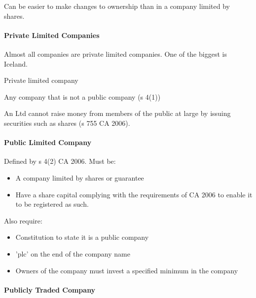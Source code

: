 \documentclass[
]{article}
\providecommand{\tightlist}{%
  \setlength{\itemsep}{0pt}\setlength{\parskip}{0pt}}
\newenvironment{env-c5a1f670-a83c-479e-bf69-eca11d8e9e55}
{
    \savenotes\tcolorbox[blanker,breakable,left=5pt,borderline west={2pt}{-4pt}{gold}]
}
{
    \endtcolorbox\spewnotes
}
\begin{document}
Can be easier to make changes to ownership than in a company limited by
shares.

\hypertarget{private-limited-companies}{%
\paragraph{Private Limited Companies}\label{private-limited-companies}}

Almost all companies are private limited companies. One of the biggest
is Iceland.

\begin{env-c5a1f670-a83c-479e-bf69-eca11d8e9e55}

Private limited company

Any company that is not a public company (s 4(1))

\end{env-c5a1f670-a83c-479e-bf69-eca11d8e9e55}

An Ltd cannot raise money from members of the public at large by issuing
securities such as shares (s 755 CA 2006).

\hypertarget{public-limited-company}{%
\paragraph{Public Limited Company}\label{public-limited-company}}

Defined by s 4(2) CA 2006. Must be:

\begin{itemize}
\tightlist
\item
  A company limited by shares or guarantee
\item
  Have a share capital complying with the requirements of CA 2006 to
  enable it to be registered as such.
\end{itemize}

Also require:

\begin{itemize}
\tightlist
\item
  Constitution to state it is a public company
\item
  'plc' on the end of the company name
\item
  Owners of the company must invest a specified minimum in the company
\end{itemize}

\hypertarget{publicly-traded-company}{%
\paragraph{Publicly Traded Company}\label{publicly-traded-company}}
\end{document}
